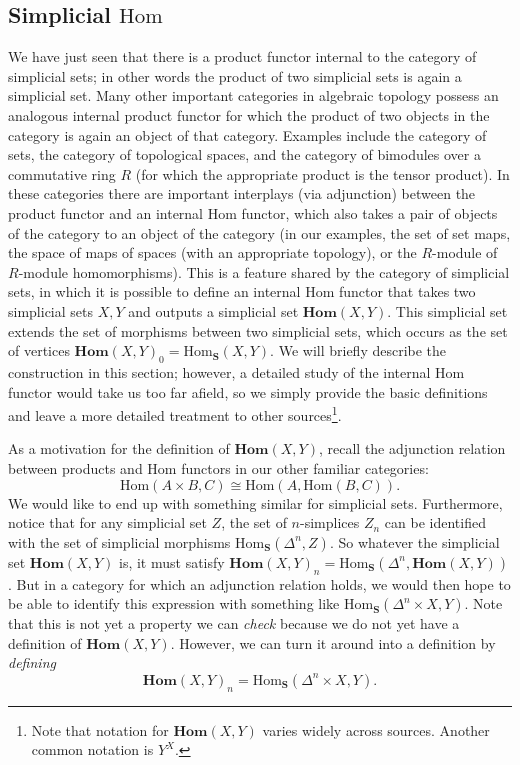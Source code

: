 \documentclass[12pt]{article}
\theoremstyle{plain}
\theoremstyle{definition}
\theoremstyle{remark}
\newcommand{\mbf}[1]{\mathbf{#1}}
\newcommand{\Hom}{\text{Hom}}
\newcommand{\Homs}{\textbf{Hom}}
\begin{document}
\subsection{Simplicial $\Hom$}\label{S: Hom}

We have just seen that there is a product functor internal to the category of simplicial sets; in other words the product of two simplicial sets is again a simplicial set. Many other important categories in algebraic topology possess an analogous internal product functor for which the product of two objects in the category is again an object of that category. Examples include the category of sets, the category of topological spaces, and the category of bimodules over a commutative ring $R$ (for which the appropriate product is the tensor product). In these categories there are important interplays (via adjunction) between the product functor and an internal $\Hom$ functor, which also takes a pair of objects of the category to an object of the category (in our examples, the set of set maps, the space of maps of spaces (with an appropriate topology), or the $R$-module of $R$-module homomorphisms). This is a feature shared by the category of simplicial sets, in which it is possible to define an internal $\Hom$ functor that takes two simplicial sets $X,Y$ and outputs a simplicial set $\Homs(X,Y)$. This simplicial set extends the set of morphisms between two simplicial sets, which occurs as the set of vertices $\Homs(X,Y)_0=\Hom_{\mbf S}(X,Y)$. We will briefly describe the construction in this section; however, a detailed study of the internal $\Hom$ functor would take us too far afield, so we simply provide the basic definitions  and leave a more detailed treatment to other sources\footnote{Note that notation for $\Homs(X,Y)$ varies widely across sources. Another common notation is $Y^X$. }. 

As a motivation for the definition of $\Homs(X,Y)$, recall the adjunction relation between products and $\Hom$ functors in our other familiar categories: $$\Hom(A\times B,C)\cong \Hom(A,\Hom(B,C)).$$ We would like to end up with something similar for simplicial sets. Furthermore, notice that for any simplicial set $Z$, the set of $n$-simplices $Z_n$ can be identified with the set of simplicial morphisms $\Hom_{\mbf S}(\Delta^n, Z)$. So whatever the simplicial set $\Homs(X,Y)$ is, it must satisfy $\Homs(X,Y)_n=\Hom_{\mbf S}(\Delta^n, \Homs(X,Y))$. But in a category for which an adjunction relation holds, we would then hope to be able to identify this expression with something like $\Hom_{\mbf S}(\Delta^n\times X,Y)$. Note that this is not yet a property we can \emph{check} because we do not yet have a definition of $\Homs(X,Y)$. However, we can turn it around into a definition by \emph{defining} $$\Homs(X,Y)_n= \Hom_{\mbf S}(\Delta^n\times X,Y).$$
\end{document}
